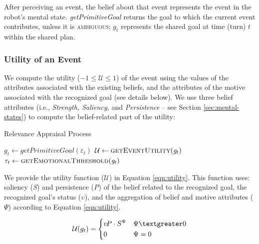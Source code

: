\documentclass[12pt]{report}
\begin{document}
After perceiving an event, the belief about that event represents the event in
the robot's mental state. \textit{getPrimitiveGoal} returns the goal to which
the current event contributes, unless it is \textsc{ambiguous}; $g_{t}$
represents the shared goal at time (turn) $t$ within the shared plan. 

\vspace*{-4mm}
\subsubsection{Utility of an Event}
We compute the utility ($-1 \leq \mathcal{U} \leq 1$) of the event using the
values of the attributes associated with the existing beliefs, and the
attributes of the motive associated with the recognized goal (see details
below). We use three belief attributes (i.e., \textit{Strength, Saliency,} and 
\textit{Persistence} -- see Section \ref{sec:mental-states}) to compute the
belief-related part of the utility:

\begin{algorithm}
	\caption{Relevance Appraisal Process}
	\label{alg:relevance}
	\begin{algorithmic}[1]
 			\Statex
			\State $\mathit{g}_{t} \gets \textit{getPrimitiveGoal}{(\varepsilon_t)}$
 			\Statex
			\State $\mathcal{U} \gets \Call{getEventUtility}{\mathit{g}_{t}}$
			\State $\tau_{t} \gets \Call{getEmotionalThreshold}{\mathit{g}_{t}}$
 			\Statex
 				\State {}
			\Else 
 				\State {}
			\EndIf
		\EndFunction
	\end{algorithmic}
\end{algorithm}

We provide the utility function ($\mathcal{U}$) in Equation \ref{eqn:utility}.
This function uses: saliency (\textit{S}) and persistence (\textit{P}) of the
belief related to the recognized goal, the recognized goal's status
($\upsilon$), and the aggregation of belief and motive attributes ($\Psi$)
according to Equation \ref{eqn:utility}.

\begin{equation}
    \mathcal{U}(g_t)= 
    \begin{dcases}
       \upsilon\!P\cdot S^{\Psi} & \Psi \textgreater 0 \\
       0               			 & \Psi = 0
    \end{dcases}
    \label{eqn:utility}
\end{equation}
\end{document}
